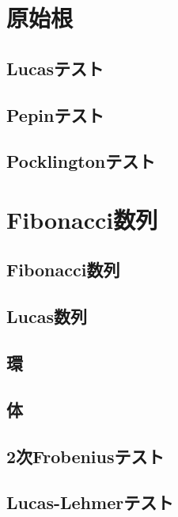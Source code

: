 \section{原始根}
\subsection{Lucasテスト}

\subsection{Pepinテスト}

\subsection{Pocklingtonテスト}


\section{Fibonacci数列}
\subsection{Fibonacci数列}

\subsection{Lucas数列}

\subsection{環}

\subsection{体}

\subsection{2次Frobeniusテスト}

\subsection{Lucas-Lehmerテスト}


\newpage
\printindex



